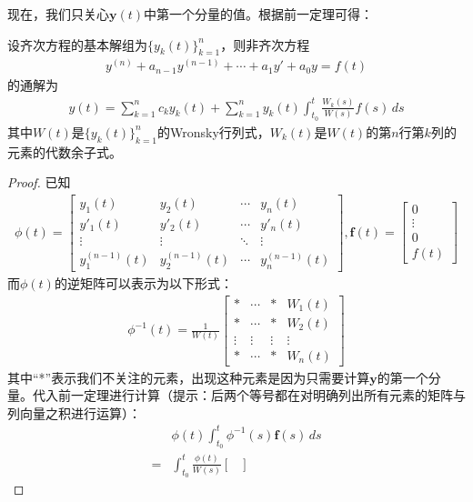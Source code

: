 现在，我们只关心$\mathbf{y}(t)$中第一个分量的值。根据前一定理可得：
\begin{theorem}
    设齐次方程的基本解组为$\{y_k(t)\}_{k=1}^n$，则非齐次方程\begin{align*}
    y^{(n)}+a_{n-1}y^{(n-1)}+\cdots+a_1y'+a_0y=f(t)
    \end{align*}
    的通解为\begin{align*}
    y(t)=\sum_{k=1}^n c_k y_k(t)+\sum_{k=1}^n y_k(t)\int_{t_0}^t \frac{W_k(s)}{W(s)}f(s)\,ds
    \end{align*}
    其中$W(t)$是$\{y_k(t)\}_{k=1}^n$的Wronsky行列式，$W_k(t)$是$W(t)$的第$n$行第$k$列的元素的代数余子式。
\end{theorem}
\begin{proof}
    已知\begin{align*}
        \phi(t)=\begin{bmatrix}
        y_1(t) & y_2(t) & \cdots & y_n(t)\\
        y'_1(t) & y'_2(t) & \cdots & y'_n(t)\\
        \vdots & \vdots & \ddots & \vdots\\
        y_1^{(n-1)}(t) & y_2^{(n-1)}(t) & \cdots & y_n^{(n-1)}(t)
        \end{bmatrix},\mathbf{f}(t)=\begin{bmatrix}
        0\\
        \vdots\\
        0\\
        f(t)
        \end{bmatrix}
    \end{align*}
    而$\phi(t)$的逆矩阵可以表示为以下形式：\begin{align*}
        \phi^{-1}(t)=\frac{1}{W(t)}\begin{bmatrix}
        * & \cdots & * & W_1(t)\\
        * &  \cdots & * & W_2(t)\\
        \vdots & \vdots & \vdots & \vdots\\
        * &  \cdots & * & W_n(t)
        \end{bmatrix}
    \end{align*}
    其中“*”表示我们不关注的元素，出现这种元素是因为只需要计算$\mathbf{y}$的第一个分量。代入前一定理进行计算（提示：后两个等号都在对明确列出所有元素的矩阵与列向量之积进行运算）：\begin{align*}
        &\phi(t)\int_{t_0}^t \phi^{-1}(s)\mathbf{f}(s)\,ds\\
        =&\int_{t_0}^t \frac{\phi(t)}{W(s)}\begin{bmatrix}

\end{bmatrix}
\end{align*}
\end{proof}
